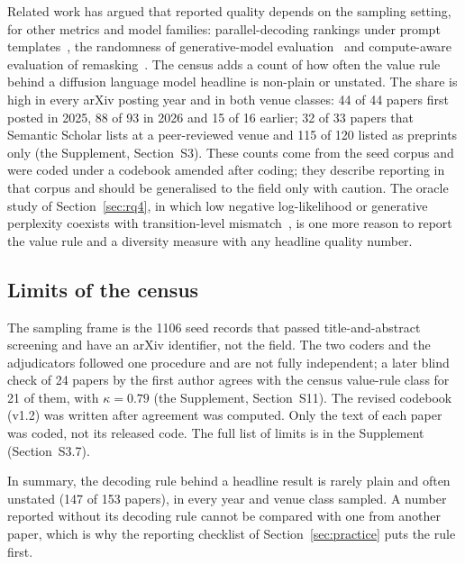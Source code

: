 Related work has argued that reported quality depends on the sampling setting, for other metrics and model families: parallel-decoding rankings under prompt templates~\cite{arXiv:2606.29228}, the randomness of generative-model evaluation~\cite{arXiv:2606.20536} and compute-aware evaluation of remasking~\cite{arXiv:2607.24763}. The census adds a count of how often the value rule behind a diffusion language model headline is non-plain or unstated. The share is high in every arXiv posting year and in both venue classes: 44 of 44 papers first posted in 2025, 88 of 93 in 2026 and 15 of 16 earlier; 32 of 33 papers that Semantic Scholar lists at a peer-reviewed venue and 115 of 120 listed as preprints only (the Supplement, Section~S3). These counts come from the seed corpus and were coded under a codebook amended after coding; they describe reporting in that corpus and should be generalised to the field only with caution. The oracle study of Section~\ref{sec:rq4}, in which low negative log-likelihood or generative perplexity coexists with transition-level mismatch~\cite{arXiv:2602.19619}, is one more reason to report the value rule and a diversity measure with any headline quality number. %

\subsection{Limits of the census}
\label{sec:census-limits}
The sampling frame is the 1106 seed records that passed title-and-abstract screening and have an arXiv identifier, not the field. The two coders and the adjudicators followed one procedure and are not fully independent; a later blind check of 24 papers by the first author agrees with the census value-rule class for 21 of them, with $\kappa=0.79$ (the Supplement, Section~S11). The revised codebook (v1.2) was written after agreement was computed. Only the text of each paper was coded, not its released code. The full list of limits is in the Supplement (Section~S3.7). %

In summary, the decoding rule behind a headline result is rarely plain and often unstated (147 of 153 papers), in every year and venue class sampled. A number reported without its decoding rule cannot be compared with one from another paper, which is why the reporting checklist of Section~\ref{sec:practice} puts the rule first.
